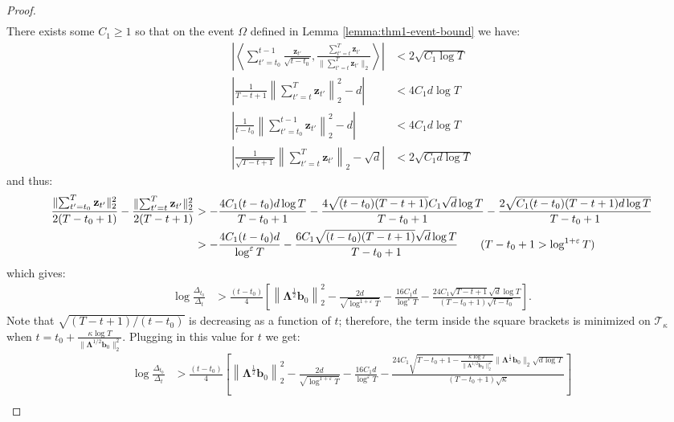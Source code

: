 \begin{proof}
\begin{align*}
\end{align*}
\normalsize
There exists some $C_1 \geq 1$ so that on the event $\Omega$ defined in Lemma \ref{lemma:thm1-event-bound} we have:
\begin{align*}
    \left|\left\langle \sum_{t'=t_0}^{t-1}\frac{\mathbf{z}_{t'}}{\sqrt{t-t_0}}, \frac{\sum_{t'=t}^{T}\mathbf{z}_{t'}}{\lVert\sum_{t'=t}^{T}\mathbf{z}_{t'}\rVert_2}\right\rangle\right| &< 2\sqrt{C_1\log T} \tag{on $\Omega_3\subseteq\Omega$} \\
    \left|\frac{1}{T-t+1}\left\lVert\sum_{t'=t}^T\mathbf{z}_{t'}\right\rVert_2^2 - d\right| &< 4C_1d\log T \tag{on $\Omega_4\subseteq\Omega$} \\
    \left|\frac{1}{t-t_0}\left\lVert\sum_{t'=t_0}^{t-1}\mathbf{z}_{t'}\right\rVert_2^2 - d\right| &< 4C_1d\log T \tag{on $\Omega_5\subseteq\Omega$} \\
    \left|\frac{1}{\sqrt{T-t+1}}\left\lVert\sum_{t'=t}^{T}\mathbf{z}_{t'}\right\rVert_2 -\sqrt{d}\right| &< 2\sqrt{C_1 d\log T} \tag{on $\Omega_6\subseteq\Omega$}
\end{align*}
and thus:
\small
\begin{align*}
    \frac{\lVert\sum_{t'=t_0}^T\mathbf{z}_{t'}\rVert_2^2}{2(T-t_0+1)} - \frac{\lVert\sum_{t'=t}^T\mathbf{z}_{t'}\rVert_2^2}{2(T-t+1)} &> -\frac{4C_1(t-t_0)d\log T}{T-t_0+1} - \frac{4\sqrt{(t-t_0)(T-t+1)}C_1\sqrt{d}\log T}{T-t_0+1} - \frac{2\sqrt{C_1(t-t_0)(T-t+1)d\log T}}{T-t_0+1}\\
    &> -\frac{4C_1(t-t_0)d}{\log^{\varepsilon}T} - \frac{6C_1\sqrt{(t-t_0)(T-t+1)}\sqrt{d}\log T}{T-t_0+1} \tag{$T-t_0+1 > \log^{1+\varepsilon}T$}
\end{align*} 
\normalsize
which gives:
\begin{align*}
    \log \frac{\Delta_{t_0}}{\Delta_t} &> \frac{(t-t_0)}{4}\left[\left\lVert\boldsymbol{\Lambda}^{\frac{1}{2}}\mathbf{b}_0\right\rVert_2^2 - \frac{2d}{\sqrt{\log^{1+\varepsilon}  T}} - \frac{16C_1 d}{\log^{\varepsilon}T} - \frac{24C_1\sqrt{T-t+1}\sqrt{d}\log T}{(T-t_0+1)\sqrt{t-t_0}}\right].
\end{align*}
Note that $\sqrt{(T-t+1)/(t-t_0)}$ is decreasing as a function of $t$; therefore, the term inside the square brackets is minimized on $\mathcal{T}_\kappa$ when $t = t_0 + \frac{\kappa\log T}{\lVert\boldsymbol{\Lambda}^{1/2}\mathbf{b}_0\rVert_2^2}$. Plugging in this value for $t$ we get:
\small
\begin{align*}
    \log \frac{\Delta_{t_0}}{\Delta_t} &> \frac{(t-t_0)}{4}\left[\left\lVert\boldsymbol{\Lambda}^{\frac{1}{2}}\mathbf{b}_0\right\rVert_2^2 - \frac{2d}{\sqrt{\log^{1+\varepsilon}  T}} - \frac{16C_1 d}{\log^{\varepsilon}T}  - \frac{24C_1\sqrt{T-t_0+1 - \frac{\kappa\log T}{\lVert\boldsymbol{\Lambda}^{1/2}\mathbf{b}_0\rVert_2^2}}\lVert\boldsymbol{\Lambda}^{\frac{1}{2}}\mathbf{b}_0\rVert_2\sqrt{d\log T}}{(T-t_0+1)\sqrt{\kappa}}\right] \\

\end{align*}
\end{proof}
